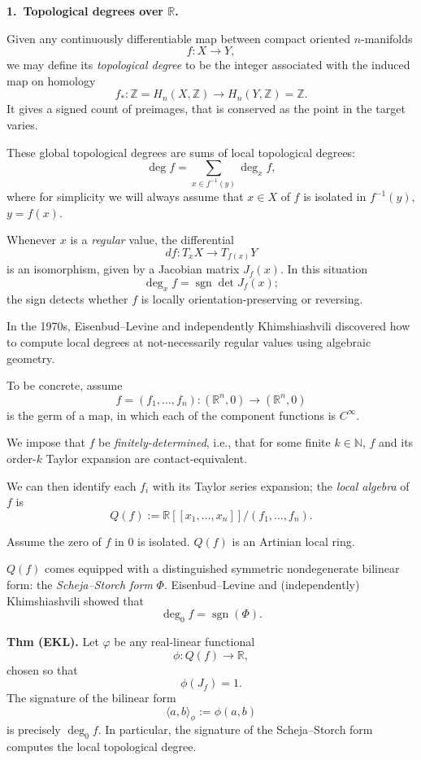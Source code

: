 \medskip\noindent
{\bf 1.\ Topological degrees over
$\mathbb{R}$.}

Given any continuously differentiable
map between compact oriented
$n$-manifolds
$$
f\colon X\longrightarrow Y,
$$
we may define its {\it topological degree}
to be the integer associated with the
induced map on homology
$$
f_*\colon
\mathbb{Z}=H_n(X,\mathbb{Z})
\longrightarrow
H_n(Y,\mathbb{Z})=\mathbb{Z}.
$$
It gives a signed count of preimages,
that is conserved as the point in the
target varies.

These global topological degrees are sums
of local topological degrees:
$$
\deg f
=
\sum_{x\in f^{-1}(y)}
\deg_x f,
$$
where for simplicity we will always
assume that $x\in X$ of $f$ is isolated
in $f^{-1}(y)$, $y=f(x)$.

Whenever $x$ is a {\it regular} value,
the differential
$$
df\colon T_xX\longrightarrow T_{f(x)}Y
$$
is an isomorphism, given by a Jacobian
matrix $J_f(x)$.
In this situation
$$
\deg_x f=\operatorname{sgn}\det J_f(x);
$$
the sign detects whether $f$ is locally
orientation-preserving or reversing.

In the 1970s, Eisenbud--Levine and
independently Khimshiashvili discovered
how to compute local degrees at
not-necessarily regular values using
algebraic geometry.

To be concrete, assume
$$
f=(f_1,\ldots,f_n)\colon
(\mathbb{R}^n,0)
\longrightarrow
(\mathbb{R}^n,0)
$$
is the germ of a map, in which each of
the component functions is $C^\infty$.

We impose that $f$ be
{\it finitely-determined}, i.e., that for
some finite $k\in\mathbb{N}$, $f$ and its
order-$k$ Taylor expansion are
contact-equivalent.

We can then identify each $f_i$ with its
Taylor series expansion; the
{\it local algebra} of $f$ is
$$
Q(f)
:=
\mathbb{R}[[x_1,\ldots,x_n]]
/
(f_1,\ldots,f_n).
$$

Assume the zero of $f$ in $0$ is
isolated.
$Q(f)$ is an Artinian local ring.

$Q(f)$ comes equipped with a distinguished
symmetric nondegenerate bilinear form:
the {\it Scheja--Storch form} $\Phi$.
Eisenbud--Levine and (independently)
Khimshiashvili showed that
$$
\deg_0 f=\operatorname{sgn}(\Phi).
$$

\medskip\noindent
{\bf Thm (EKL).}
Let $\varphi$ be any real-linear
functional
$$
\phi\colon Q(f)\longrightarrow\mathbb{R},
$$
chosen so that
$$
\phi(J_f)=1.
$$
The signature of the bilinear form
$$
\langle a,b\rangle_\phi
:=
\phi(a,b)
$$
is precisely $\deg_0 f$.
In particular, the signature of the
Scheja--Storch form computes the local
topological degree.

